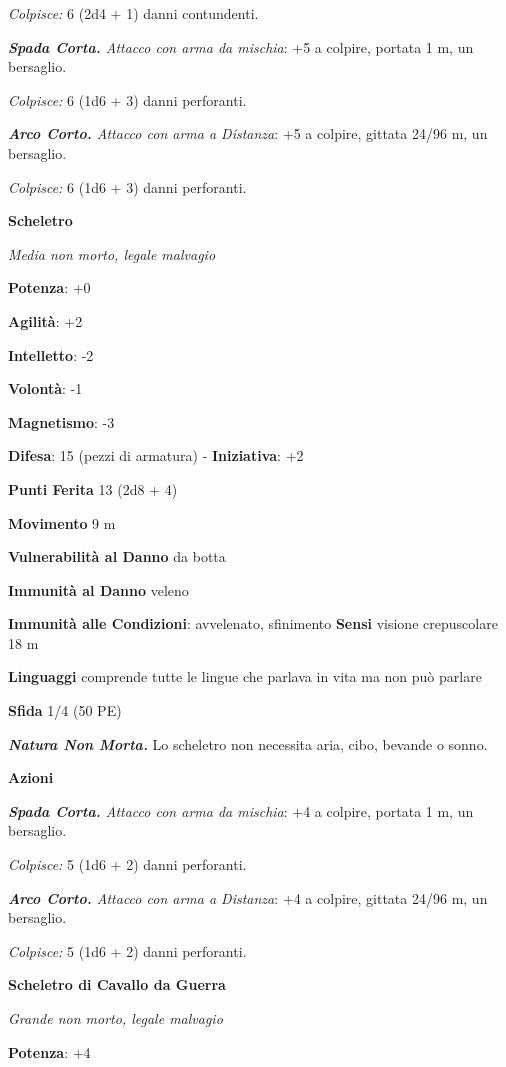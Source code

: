 \begin{multicols}{2}
\emph{Colpisce:} 6 (2d4 + 1) danni contundenti.

\emph{\textbf{Spada Corta.} Attacco con arma da mischia}: +5 a colpire,
portata 1 m, un bersaglio.

\emph{Colpisce:} 6 (1d6 + 3) danni perforanti.

\emph{\textbf{Arco Corto.} Attacco con arma a Distanza}: +5 a colpire,
gittata 24/96 m, un bersaglio.

\emph{Colpisce:} 6 (1d6 + 3) danni perforanti.

\textbf{Scheletro}

\emph{Media non morto, legale malvagio}

\textbf{Potenza}: +0

\textbf{Agilità}: +2

\textbf{Intelletto}: -2

\textbf{Volontà}: -1

\textbf{Magnetismo}: -3

\textbf{Difesa}: 15 (pezzi di armatura) - \textbf{Iniziativa}: +2

\textbf{Punti Ferita} 13 (2d8 + 4)

\textbf{Movimento} 9 m

\textbf{Vulnerabilità al Danno} da botta

\textbf{Immunità al Danno} veleno

\textbf{Immunità alle Condizioni}: avvelenato, sfinimento \textbf{Sensi}
visione crepuscolare 18 m

\textbf{Linguaggi} comprende tutte le lingue che parlava in vita ma non
può parlare

\textbf{Sfida} 1/4 (50 PE)\smallskip

\emph{\textbf{Natura Non Morta.}} Lo scheletro non necessita aria, cibo,
bevande o sonno.

\smallskip\textbf{Azioni}

\emph{\textbf{Spada Corta.} Attacco con arma da mischia}: +4 a colpire,
portata 1 m, un bersaglio.

\emph{Colpisce:} 5 (1d6 + 2) danni perforanti.

\emph{\textbf{Arco Corto.} Attacco con arma a Distanza}: +4 a colpire,
gittata 24/96 m, un bersaglio.

\emph{Colpisce:} 5 (1d6 + 2) danni perforanti.

\textbf{Scheletro di Cavallo da Guerra}

\emph{Grande non morto, legale malvagio}

\textbf{Potenza}: +4


\end{multicols}
